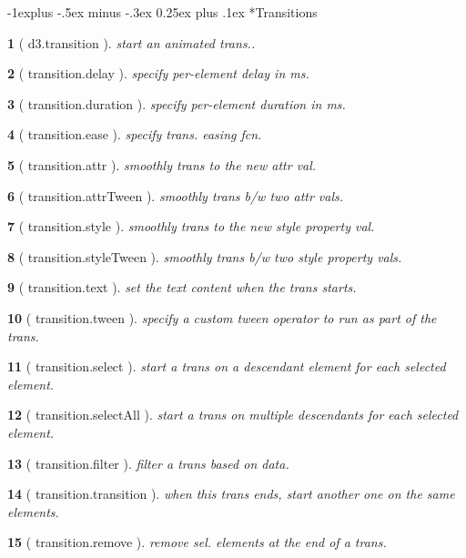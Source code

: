 \documentclass[10pt,landscape,letterpaper]{article}
\makeatletter
\newcounter{thm}
\theoremstyle{mytheoremstyle}
\newtheorem*{thm}{}
\renewcommand{\subsection}{\@startsection{subsection}{2}{0mm}%
                                {-1explus -.5ex minus -.3ex}%
                                {0.25ex plus .1ex}%
                                {\normalfont\normalsize\bfseries}}
\makeatother
\begin{document}
\begin{multicols}{3}
\subsection*{Transitions}

\begin{thm} [ d3.transition ]  start an animated trans..
\end{thm}\begin{thm} [ transition.delay ]  specify per-element delay in ms.
\end{thm}\begin{thm} [ transition.duration ]  specify per-element duration in ms.
\end{thm}\begin{thm} [ transition.ease ]  specify trans. easing fcn.
\end{thm}\begin{thm} [ transition.attr ]  smoothly trans to the new attr val.
\end{thm}\begin{thm} [ transition.attrTween ]  smoothly trans b/w two attr vals.
\end{thm}\begin{thm} [ transition.style ]  smoothly trans to the new style property val.
\end{thm}\begin{thm} [ transition.styleTween ]  smoothly trans b/w two style property vals.
\end{thm}\begin{thm} [ transition.text ]  set the text content when the trans starts.
\end{thm}\begin{thm} [ transition.tween ]  specify a custom tween operator to run as part of the trans.
\end{thm}\begin{thm} [ transition.select ]  start a trans on a descendant element for each selected element.
\end{thm}\begin{thm} [ transition.selectAll ]  start a trans on multiple descendants for each selected element.
\end{thm}\begin{thm} [ transition.filter ]  filter a trans based on data.
\end{thm}\begin{thm} [ transition.transition ]  when this trans ends, start another one on the same elements.
\end{thm}\begin{thm} [ transition.remove ]  remove sel. elements at the end of a trans.

\end{thm}
\end{multicols}
\end{document}

